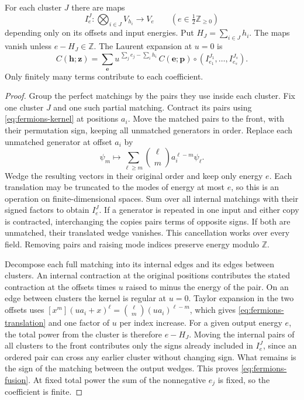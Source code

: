 \begin{proposition}[Fusion]\label{prop:fusion}
For each cluster $J$ there are maps
\[
 I_e^J:\bigotimes_{i\in J}V_{h_i}\longrightarrow V_e
 \qquad(e\in\tfrac12\mathbb Z_{\ge0})
\]
depending only on its offsets and input energies. Put
$H_J=\sum_{i\in J}h_i$. The maps vanish unless $e-H_J\in\mathbb Z$.
The Laurent expansion at $u=0$ is
\begin{equation}\label{eq:fermions-fusion}
 C(\mathbf h;\mathbf z)
 =\sum_{\mathbf e}u^{\,\sum_j e_j-\sum_i h_i}\,
 C(\mathbf e;\mathbf p)\circ
       (I^{J_1}_{e_1},\ldots,I^{J_s}_{e_s}).
\end{equation}
Only finitely many terms contribute to each coefficient.
\end{proposition}

\begin{proof}
Group the perfect matchings by the pairs they use inside each cluster.
Fix one cluster $J$ and one such partial matching. Contract its pairs
using \eqref{eq:fermions-kernel} at positions $a_i$. Move the matched pairs to the front, with their permutation sign,
keeping all unmatched generators in order. Replace each unmatched generator
at offset $a_i$ by
\begin{equation}\label{eq:fermions-translation}
 \psi_m\longmapsto
          \sum_{\ell\ge m}\binom{\ell}{m}a_i^{\ell-m}\psi_\ell .
\end{equation}
Wedge the resulting vectors in their original order and keep only energy
$e$. Each translation may be truncated to the modes of energy at most
$e$, so this is an operation on finite-dimensional spaces. Sum over
all internal matchings with their signed factors to obtain $I_e^J$.
If a generator is repeated in one input and either copy is contracted,
interchanging the copies pairs terms of opposite signs. If both are
unmatched, their translated wedge vanishes. This cancellation
works over every field. Removing pairs
and raising mode indices preserve energy modulo $\mathbb Z$.

Decompose each full matching into its internal edges and its edges between
clusters. An internal contraction at the original positions contributes the
stated contraction at the offsets times $u$ raised to minus the energy of
the pair. On an edge between clusters the kernel is regular at $u=0$.
Taylor expansion in the two offsets uses
$[x^m](u a_i+x)^\ell=\binom{\ell}{m}(u a_i)^{\ell-m}$, which gives
\eqref{eq:fermions-translation} and one factor of $u$ per index increase.
For a given output energy $e$, the total power from the cluster is therefore
$e-H_J$. Moving the internal pairs of all clusters to the front contributes
only the signs already included in $I_e^J$, since an ordered pair can
cross any earlier cluster without changing sign. What remains is the
sign of the matching between the output wedges. This proves
\eqref{eq:fermions-fusion}. At fixed total power the sum of the nonnegative
$e_j$ is fixed, so the coefficient is finite.
\end{proof}

